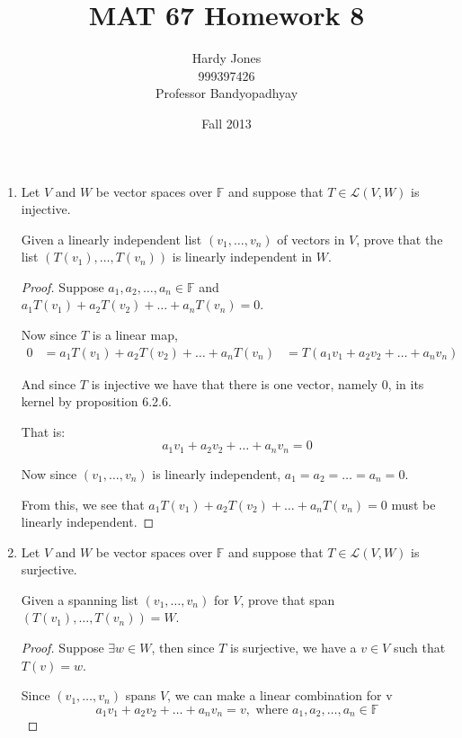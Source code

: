 \documentclass[12pt,letterpaper]{article}
\title{MAT 67 Homework 8\vspace{-2ex}}
\author{Hardy Jones\\
        999397426\\
        Professor Bandyopadhyay\vspace{-2ex}}
\date{Fall 2013}
\begin{document}
  \maketitle

  \begin{enumerate}
    \item
      Let $V$ and $W$ be vector spaces over $\mathbb{F}$
      and suppose that $T \in \mathcal{L}(V,W)$ is injective.

      Given a linearly independent list $(v_1, \dots, v_n)$ of vectors in $V$,
      prove that the list $(T(v_1), \dots, T(v_n))$ is linearly independent in $W$.

      \begin{proof}
        Suppose $a_1, a_2, \dots, a_n \in \mathbb{F}$ and
        $a_1T(v_1) + a_2T(v_2) + \dots + a_nT(v_n) = 0$.

        Now since $T$ is a linear map,
        \begin{align*}
          0 &= a_1T(v_1) + a_2T(v_2) + \dots + a_nT(v_n)
          &= T(a_1v_1 + a_2v_2 + \dots + a_nv_n)
        \end{align*}

        And since $T$ is injective we have that there is one vector, namely $0$, in its kernel by proposition 6.2.6.

        That is:
        \[a_1v_1 + a_2v_2 + \dots + a_nv_n = 0\]

        Now since $(v_1, \dots, v_n)$ is linearly independent,
        $a_1 = a_2 = \dots = a_n = 0$.

        From this, we see that $a_1T(v_1) + a_2T(v_2) + \dots + a_nT(v_n) = 0$
        must be linearly independent.
      \end{proof}

    \item
      Let $V$ and $W$ be vector spaces over $\mathbb{F}$
      and suppose that $T \in \mathcal{L}(V,W)$ is surjective.

      Given a spanning list $(v_1, \dots, v_n)$ for $V$,
      prove that span$(T(v_1), \dots, T(v_n)) = W$.

      \begin{proof}
        Suppose $\exists w \in W$, then since $T$ is surjective,
        we have a $v \in V$ such that $T(v) = w$.

        Since $(v_1, \dots, v_n)$ spans $V$, we can make a linear combination for v
        \[a_1v_1 + a_2v_2 + \dots + a_nv_n = v, \text{ where } a_1, a_2, \dots, a_n \in \mathbb{F}\]


\end{proof}
\end{enumerate}
\end{document}
